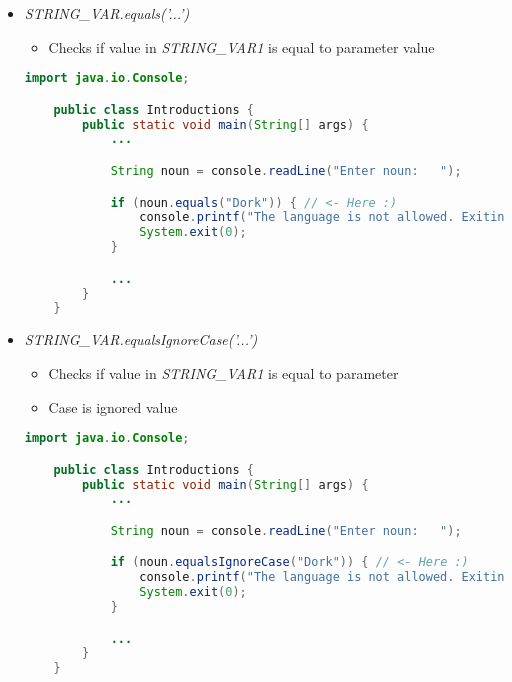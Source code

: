 \documentclass[12pt]{article}
\begin{document}
\begin{itemize}
    \item \textit{STRING\_VAR.equals('...')}
    \begin{itemize}
        \item Checks if value in \textit{STRING\_VAR1} is equal to parameter
        value
    \end{itemize}
    \begin{lstlisting}[language=Java]
    import java.io.Console;

    public class Introductions {
        public static void main(String[] args) {
            ...

            String noun = console.readLine("Enter noun:   ");

            if (noun.equals("Dork")) { // <- Here :)
                console.printf("The language is not allowed. Exiting\n");
                System.exit(0);
            }

            ...
        }
    }
    \end{lstlisting}
    \item \textit{STRING\_VAR.equalsIgnoreCase('...')}
    \begin{itemize}
        \item Checks if value in \textit{STRING\_VAR1} is equal to parameter
        \item Case is ignored
        value
    \end{itemize}

    \bigskip

    \begin{lstlisting}[language=Java]
    import java.io.Console;

    public class Introductions {
        public static void main(String[] args) {
            ...

            String noun = console.readLine("Enter noun:   ");

            if (noun.equalsIgnoreCase("Dork")) { // <- Here :)
                console.printf("The language is not allowed. Exiting\n");
                System.exit(0);
            }

            ...
        }
    }
    \end{lstlisting}
\end{itemize}
\end{document}
